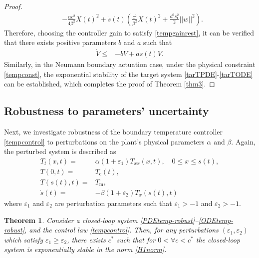 \documentclass[journal]{IEEEtran}
\newtheorem{thm}{Theorem}
\begin{document}
\begin{proof}
\begin{align}
&- \frac{\alpha c^2}{4\beta^2} X(t)^2+\dot{s}(t) \left(\frac{c^2}{\beta^2} X(t)^2 + \frac{d^2 s_{{\mathrm r}}^2}{2}||w||^2 \right). 
\end{align}
Therefore, choosing the controller gain to satisfy \eqref{tempgainrest}, it can be verified that there exists positive parameters $b$ and $a$ such that 
\begin{align}
\dot{V} \leq &- b V + a \dot{s}(t) V. 
\end{align}
Similarly, in the Neumann boundary actuation case, under the physical constraint \eqref{tempconst}, the exponential stability of the target system \eqref{tarTPDE}-\eqref{tarTODE} can be established, which completes the proof of Theorem \ref{thm3}. 
\end{proof}

\subsection{Robustness to parameters' uncertainty}
Next, we investigate robustness of the boundary temperature controller  \eqref{tempcontrol} to perturbations on the plant's physical parameters $\alpha $ and $\beta$. Again, the perturbed system is described as 
\begin{align}
 \label{PDEtemp-robust}
 T_{t}(x,t) =& \alpha(1+{\varepsilon}_1) T_{xx}(x,t), \quad 0\le x\le s(t), \\
\label{BCtemp-robust} T(0,t) =& T_{{\mathrm c}}(t), \\
\label{BC2temp-robust}T(s(t),t) =& T_{{\mathrm m}}, \\
\label{ODEtemp-robust}\dot{s}(t) =& - \beta(1+{\varepsilon}_2) T_{x}(s(t),t)
\end{align}
where $\varepsilon_1$ and $\varepsilon_2$ are perturbation parameters such that $\varepsilon_1>-1$ and $\varepsilon_2>-1$.
\begin{thm}\label{robust-temp}
Consider a closed-loop system \eqref{PDEtemp-robust}--\eqref{ODEtemp-robust}, and the control law \eqref{tempcontrol}. Then, for any perturbations $({\varepsilon}_1, {\varepsilon}_2)$ which satisfy ${\varepsilon}_1\ge {\varepsilon}_2$, there exists $c^*$ such that for $0<\forall c<c^*$ the closed-loop system is exponentially stable in the norm \eqref{H1norm}.
\end{thm}
\end{document}
